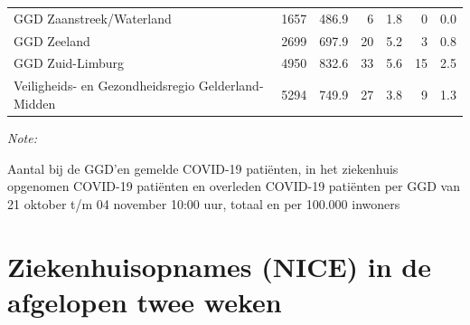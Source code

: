 \documentclass[
  english,
  man,floatsintext]{apa6}
\begin{document}
\begin{table}
\begin{threeparttable}
\begin{tabular}{lrrrrrr}
GGD Zaanstreek/Waterland & 1657 & 486.9 & 6 & 1.8 & 0 & 0.0\\
GGD Zeeland & 2699 & 697.9 & 20 & 5.2 & 3 & 0.8\\
GGD Zuid-Limburg & 4950 & 832.6 & 33 & 5.6 & 15 & 2.5\\
Veiligheids- en Gezondheidsregio Gelderland-Midden & 5294 & 749.9 & 27 & 3.8 & 9 & 1.3\\
\bottomrule
\end{tabular}
\begin{tablenotes}
\item \textit{Note: } 
\item Aantal bij de GGD’en gemelde COVID-19 patiënten, in het ziekenhuis opgenomen COVID-19 patiënten en overleden COVID-19 patiënten per GGD van 21 oktober t/m 04 november 10:00 uur, totaal en per 100.000 inwoners
\end{tablenotes}
\end{threeparttable}
\endgroup{}
\end{table}

\newpage

\hypertarget{ziekenhuisopnames-nice-in-de-afgelopen-twee-weken}{%
\section{Ziekenhuisopnames (NICE) in de afgelopen twee weken}\label{ziekenhuisopnames-nice-in-de-afgelopen-twee-weken}}
\end{document}
